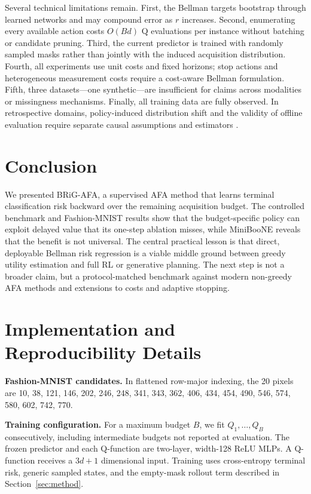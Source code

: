 \documentclass[10pt]{article}
\newcommand{\method}{BRiG-AFA}
\begin{document}
Several technical limitations remain. First, the Bellman targets bootstrap through learned networks and may compound error as $r$ increases. Second, enumerating every available action costs $O(Bd)$ Q evaluations per instance without batching or candidate pruning. Third, the current predictor is trained with randomly sampled masks rather than jointly with the induced acquisition distribution. Fourth, all experiments use unit costs and fixed horizons; stop actions and heterogeneous measurement costs require a cost-aware Bellman formulation. Fifth, three datasets---one synthetic---are insufficient for claims across modalities or missingness mechanisms. Finally, all training data are fully observed. In retrospective domains, policy-induced distribution shift and the validity of offline evaluation require separate causal assumptions and estimators \citep{vonkleist2023evaluation}.

\section{Conclusion}
We presented \method, a supervised AFA method that learns terminal classification risk backward over the remaining acquisition budget. The controlled benchmark and Fashion-MNIST results show that the budget-specific policy can exploit delayed value that its one-step ablation misses, while MiniBooNE reveals that the benefit is not universal. The central practical lesson is that direct, deployable Bellman risk regression is a viable middle ground between greedy utility estimation and full RL or generative planning. The next step is not a broader claim, but a protocol-matched benchmark against modern non-greedy AFA methods and extensions to costs and adaptive stopping.

\appendix
\section{Implementation and Reproducibility Details}\label{app:details}
\noindent\textbf{Fashion-MNIST candidates.} In flattened row-major indexing, the 20 pixels are {\small 10, 38, 121, 146, 202, 246, 248, 341, 343, 362, 406, 434, 454, 490, 546, 574, 580, 602, 742, 770.}

\noindent\textbf{Training configuration.} For a maximum budget $B$, we fit $Q_1,\ldots,Q_B$ consecutively, including intermediate budgets not reported at evaluation. The frozen predictor and each Q-function are two-layer, width-128 ReLU MLPs. A Q-function receives a $3d+1$ dimensional input. Training uses cross-entropy terminal risk, generic sampled states, and the empty-mask rollout term described in Section~\ref{sec:method}.
\end{document}
